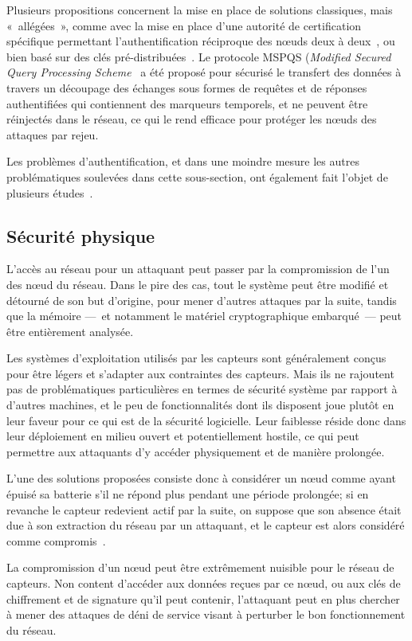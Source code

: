 Plusieurs propositions concernent la mise en place de solutions classiques, mais « allégées », comme avec la mise en place d'une autorité de certification spécifique permettant l'authentification réciproque des nœuds deux à deux~\cite{GWZCK13}, ou bien basé sur des clés pré-distribuées~\cite{BSK13}.
Le protocole MSPQS (\textit{Modified Secured Query Processing Scheme}~\cite{GD14} a été proposé pour sécurisé le transfert des données à travers un découpage des échanges sous formes de requêtes et de réponses authentifiées qui contiennent des marqueurs temporels, et ne peuvent être réinjectés dans le réseau, ce qui le rend efficace pour protéger les nœuds des attaques par rejeu.

Les problèmes d'authentification, et dans une moindre mesure les autres problématiques soulevées dans cette sous-section, ont également fait l'objet de plusieurs études~\cite{GWZC13}.

\subsection{Sécurité physique}

L'accès au réseau pour un attaquant peut passer par la compromission de l'un des nœud du réseau.
Dans le pire des cas, tout le système peut être modifié et détourné de son but d'origine, pour mener d'autres attaques par la suite, tandis que la mémoire ---~et notamment le matériel cryptographique embarqué~--- peut être entièrement analysée.

Les systèmes d'exploitation utilisés par les capteurs sont généralement conçus pour être légers et s'adapter aux contraintes des capteurs.
Mais ils ne rajoutent pas de problématiques particulières en termes de sécurité système par rapport à d'autres machines, et le peu de fonctionnalités dont ils disposent joue plutôt en leur faveur pour ce qui est de la sécurité logicielle.
Leur faiblesse réside donc dans leur déploiement en milieu ouvert et potentiellement hostile, ce qui peut permettre aux attaquants d'y accéder physiquement et de manière prolongée.

L'une des solutions proposées consiste donc à considérer un nœud comme ayant épuisé sa batterie s'il ne répond plus pendant une période prolongée; si en revanche le capteur redevient actif par la suite, on suppose que son absence était due à son extraction du réseau par un attaquant, et le capteur est alors considéré comme compromis~\cite{Ho10}.

La compromission d'un nœud peut être extrêmement nuisible pour le réseau de capteurs.
Non content d'accéder aux données reçues par ce nœud, ou aux clés de chiffrement et de signature qu'il peut contenir, l'attaquant peut en plus chercher à mener des attaques de déni de service visant à perturber le bon fonctionnement du réseau.
